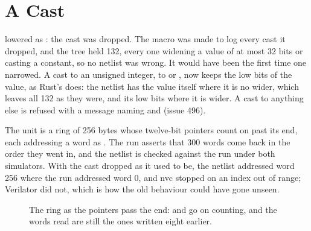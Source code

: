 \section{A Cast}
\label{sec:x-cast}

 lowered as : the cast was dropped. The macro was
made to log every cast it dropped, and the tree held 132, every one
widening a value of at most 32 bits or casting a constant, so no
netlist was wrong. It would have been the first time one narrowed. A
cast to an unsigned integer,  to  or
, now keeps the low bits of the value, as Rust's does:
the netlist has the value itself where it is no wider, which leaves
all 132 as they were, and its low bits where it is wider. A cast to
anything else is refused with a message naming  and
 (issue 496).

The unit is a ring of 256 bytes whose twelve-bit pointers count on
past its end, each addressing a word as
. The run asserts that 300 words come
back in the order they went in, and the netlist is checked against
the run under both simulators. With the cast dropped as it used to
be, the netlist addressed word 256 where the run addressed word 0, and
nvc stopped on an index out of range; Verilator did not, which is how
the old behaviour could have gone unseen.

\begin{figure}[htbp]
\centering

\caption{The ring as the pointers pass the end:  and
 go on counting, and the words read are still the ones
written eight earlier.}
\label{fig:x-cast}
\end{figure}




